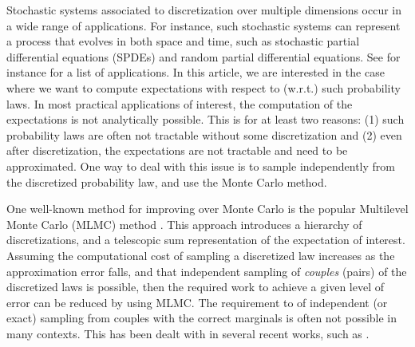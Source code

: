 \documentclass[english]{article}
\begin{document}
Stochastic systems associated to %
discretization over
multiple dimensions occur in a wide range of applications. 
For instance, such stochastic
systems can represent a process that evolves in both space and time, such as
stochastic partial differential equations (SPDEs) 
and random partial differential equations. 
See for instance \cite{beskos1} for a list of applications.  
In this article, we are interested in the case where we want to compute expectations 
with respect to (w.r.t.) such probability laws. 
In most practical applications of interest, the computation of the expectations 
is not analytically possible. 
This is for at least two reasons: (1) such probability laws
are often not tractable without some discretization and 
(2) even after discretization, the expectations are not tractable and need to be approximated.
One way to deal with this issue is to sample independently from the discretized probability law, %
and use the Monte Carlo method.

One well-known method for improving over Monte
Carlo is the popular Multilevel Monte Carlo (MLMC) method \cite{giles,giles1,hein}. This approach introduces a hierarchy of discretizations, and a %
telescopic sum representation of the expectation of interest.  
Assuming the computational cost of sampling a discretized law increases 
as the approximation error falls, 
and that independent sampling of \emph{couples} (pairs) of the discretized laws is possible, 
then the required work to achieve a given level of error can be reduced by using MLMC. 
The requirement to of independent (or exact) sampling from couples
with the correct marginals is often not possible in many contexts.
This has been dealt with in several recent works, 
such as \cite{beskos,jasra,mlpf,mlpf1}.
\end{document}
